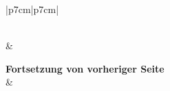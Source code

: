 \documentclass{../../inc/mybib}
\begin{document}
\begin{longtable}{|p{7cm}|p{7cm}|}
    \caption{Biblische Argumente – Pro und Kontra Israel-Ersatz} \\
    \hline
     & 
     \\
    \hline
    \endfirsthead

    {{\bfseries Fortsetzung von vorheriger Seite}} \\
    \hline
     & 
     \\
    \hline
    \endhead

    \hline {} \\
    \endfoot

    \hline
    \endlastfoot


\end{longtable}
\end{document}
